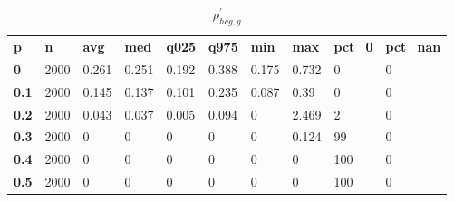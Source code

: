 \begin{table}[h]
 \centering 
\footnotesize
\caption{$\rho_{hcg,g}^\prime $}
\label{tab:alphahcgg}
\begin{tabular}[h]{| l l l l l l l l l l|
    } \hline
\textbf{ p} & \textbf{ n} & \textbf{ avg} & \textbf{ med} & \textbf{ q025} & \textbf{ q975} & \textbf{ min} & \textbf{ max} & \textbf{ pct\_0} & \textbf{ pct\_nan}
           \\
  \textbf{  0} & 2000 & 0.261 & 0.251 & 0.192 & 0.388 & 0.175 & 0.732 &   0 & 0
           \\
  \textbf{0.1} & 2000 & 0.145 & 0.137 & 0.101 & 0.235 & 0.087 &  0.39 &   0 & 0
           \\
  \textbf{0.2} & 2000 & 0.043 & 0.037 & 0.005 & 0.094 &     0 & 2.469 &   2 & 0
           \\
  \textbf{0.3} & 2000 &     0 &     0 &     0 &     0 &     0 & 0.124 &  99 & 0
           \\
  \textbf{0.4} & 2000 &     0 &     0 &     0 &     0 &     0 &     0 & 100 & 0
           \\
  \textbf{0.5} & 2000 &     0 &     0 &     0 &     0 &     0 &     0 & 100 & 0
           \\
 \hline \end{tabular}
 \end{table}
